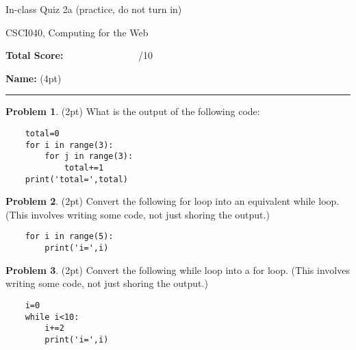 \documentclass[10pt]{article}
\theoremstyle{definition}
\newtheorem{problem}{Problem}
\begin{document}
\begin{center}
    {
\Large
In-class Quiz 2a (practice, do not turn in)
}

    \vspace{0.1in}
CSCI040, Computing for the Web

    \vspace{0.1in}
\end{center}

\vspace{0.25in}
\noindent
\textbf{Total Score:} ~~~~~~~~~~~~~~~/10

\vspace{0.5in}
\noindent
\textbf{Name:} (4pt)

\noindent
\rule{\textwidth}{0.1pt}
\vspace{0.25in}

\begin{problem}
    (2pt)
    What is the output of the following code:
\end{problem}
\begin{lstlisting}
    total=0
    for i in range(3):
        for j in range(3):
            total+=1
    print('total=',total)
\end{lstlisting}
\vspace{2in}

\newpage
\begin{problem}
    (2pt)
    Convert the following for loop into an equivalent while loop.
    (This involves writing some code, not just shoring the output.)
\end{problem}
\begin{lstlisting}
    for i in range(5):
        print('i=',i)
\end{lstlisting}
\vspace{3.5in}

\begin{problem}
    (2pt)
    Convert the following while loop into a for loop.
    (This involves writing some code, not just shoring the output.)
\end{problem}
\begin{lstlisting}
    i=0
    while i<10:
        i+=2
        print('i=',i)
\end{lstlisting}
\vspace{1.5in}
\end{document}
